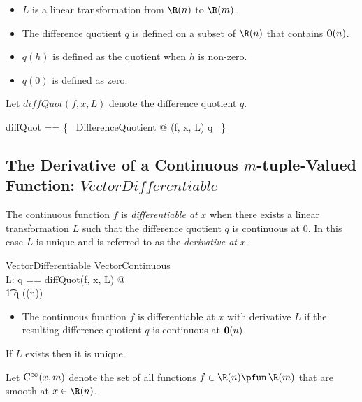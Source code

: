 \documentclass{amsart}
\begin{document}
\begin{itemize}
\item $L$ is a linear transformation from $\Rtup(n)$ to $\Rtup(m)$.
\item The difference quotient $q$ is defined on a subset of $\Rtup(n)$ that contains $\operatorname{\mathbf{0}}(n)$.
\item $q(h)$ is defined as the quotient when $h$ is non-zero.
\item $q(0)$ is defined as zero.
\end{itemize}

Let $diffQuot(f,x,L)$ denote the difference quotient $q$.

\begin{zed}
diffQuot == \{~ DifferenceQuotient @ (f, x, L) \mapsto q ~\}
\end{zed}

\subsection{The Derivative of a Continuous $m$-tuple-Valued Function: $VectorDifferentiable$}

The continuous function $f$ is \textit{differentiable at} $x$ when there exists a linear transformation $L$ 
such that the difference quotient $q$ is continuous at $0$.
In this case $L$ is unique and is referred to as the \textit{derivative at} $x$.

\begin{schema}{VectorDifferentiable}
VectorContinuous \\
L: \Rinf \pfun \Rinf
\where
\LET q == diffQuot(f, x, L) @ \\
\t1	q \in \CzeroPointRtup(\zeroRtup(n))
\end{schema}

\begin{itemize}
\item The continuous function $f$ is differentiable at $x$ with derivative $L$ if the resulting
difference quotient $q$ is continuous at $\operatorname{\mathbf{0}}(n)$.
\end{itemize}

\begin{remark}
If $L$ exists then it is unique.
\end{remark}


Let $\operatorname{C^\infty}(x,m)$ denote the set of all functions $f \in \Rtup(n) \pfun \Rtup(m)$ that are smooth at $x \in \Rtup(n)$.

\printbibliography
\end{document}
